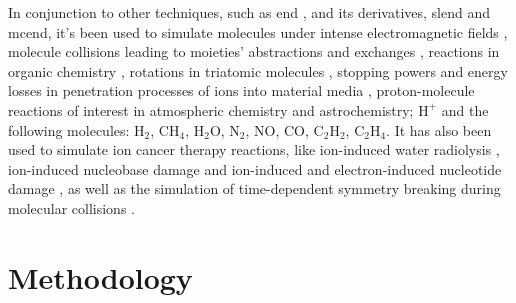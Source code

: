\documentclass{aux/ttuthes2007}
\begin{document}
In conjunction to other techniques, such as \gls{end} , and its derivatives, \gls{slend} and \gls{mcend}, it's been used to simulate molecules under intense electromagnetic fields , molecule collisions leading to moieties' abstractions and exchanges , reactions in organic chemistry , rotations in triatomic molecules , 
stopping powers and energy losses in penetration processes of ions into material media ,
proton-molecule reactions of interest in atmospheric chemistry and astrochemistry; $\text{H}^+$ and the following molecules: $\text{H}_2$, C$\text{H}_4$, $\text{H}_2$O, $\text{N}_2$, NO, CO, $\text{C}_2$$\text{H}_2$, $\text{C}_2$$\text{H}_4$.
It has also been used to simulate ion cancer therapy reactions, like ion-induced water radiolysis , ion-induced nucleobase damage  and ion-induced and electron-induced nucleotide damage ,
as well as the simulation of time-dependent symmetry breaking during molecular collisions .

\chapter{\textbf{Methodology}}\label{chap:methodology}
\end{document}

